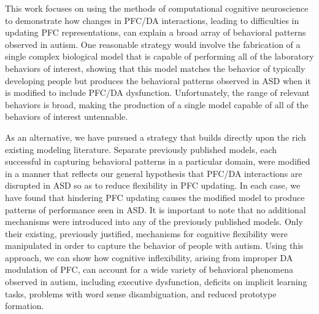 %
% 

This work focuses on using the methods of computational cognitive neuroscience to demonstrate how changes in PFC/DA interactions, leading to difficulties in updating PFC representations, can explain a broad array of behavioral patterns observed in autism. One reasonable strategy would involve the fabrication of a single complex biological model that is capable of performing all of the laboratory behaviors of interest, showing that this model matches the behavior of typically developing people but produces the behavioral patterns observed in ASD when it is modified to include PFC/DA dysfunction. Unfortunately, the range of relevant behaviors is broad, making the production of a single model capable of all of the behaviors of interest untennable.

As an alternative, we have pursued a strategy that builds directly upon the rich existing modeling literature. Separate previously published models, each successful in capturing behavioral patterns in a particular domain, were modified in a manner that reflects our general hypothesis that PFC/DA interactions are disrupted in ASD so as to reduce flexibility in PFC updating. In each case, we have found that hindering PFC updating causes the modified model to produce patterns of performance seen in ASD. It is important to note that no additional mechanisms were introduced into any of the previously published models. Only their existing, previously justified, mechanisms for cognitive flexibility were manipulated in order to capture the behavior of people with autism. Using this approach, we can show how cognitive inflexibility, arising from improper DA modulation of PFC, can account for a wide variety of behavioral phenomena observed in autism, including executive dysfunction, deficits on implicit learning tasks, problems with word sense disambiguation, and reduced prototype formation.

